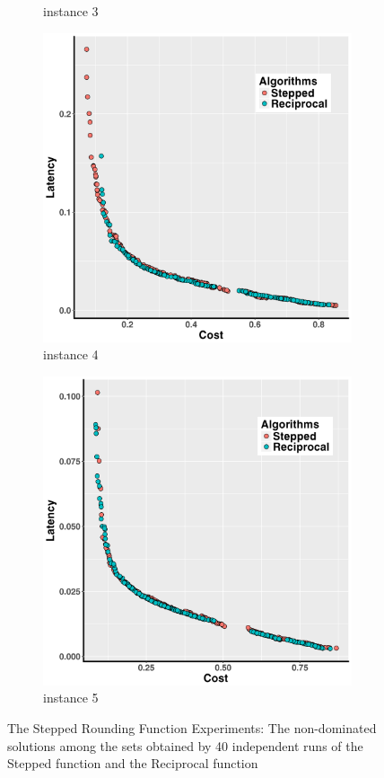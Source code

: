 \documentclass[10pt,journal,compsoc]{IEEEtran}
\begin{document}
\begin{figure}[h!]
\begin{subfigure}{0.49\linewidth}
    \caption{instance 3}
   \end{subfigure}
   \begin{subfigure}{0.49\linewidth}
       \includegraphics[width=\textwidth]{pics/transfer_problem4.png}
    \caption{instance 4}
   \end{subfigure}
   \begin{subfigure}{0.49\linewidth}
       \includegraphics[width=\textwidth]{pics/transfer_problem5.png}
    \caption{instance 5}
   \end{subfigure}
   \caption{The Stepped Rounding Function Experiments: The non-dominated solutions among the sets obtained by 40 independent runs of the Stepped function and the Reciprocal
   function}
   \label{fig:transfer}
\end{figure}
\end{document}
